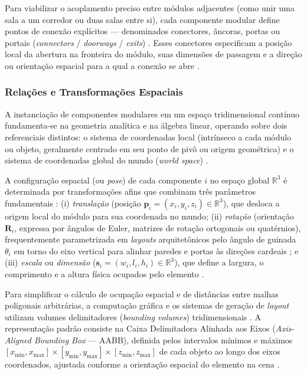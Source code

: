 Para viabilizar o acoplamento preciso entre módulos adjacentes (como unir uma sala a um corredor ou duas salas entre si), cada componente modular define pontos de conexão explícitos --- denominados conectores, âncoras, portas ou portais (\textit{connectors} / \textit{doorways} / \textit{exits}) \cite{inproceedings, linden2014dungeons, shaker2016constructive, sun2024roomplanner}. Esses conectores especificam a posição local da abertura na fronteira do módulo, suas dimensões de passagem e a direção ou orientação espacial para a qual a conexão se abre \cite{inproceedings, shaker2016constructive, sun2024roomplanner, xu2025databasedrivenframework3dlevel}.

\subsubsection{Relações e Transformações Espaciais}
\label{sec:transformacoes_espaciais}

A instanciação de componentes modulares em um espaço tridimensional contínuo fundamenta-se na geometria analítica e na álgebra linear, operando sobre dois referenciais distintos: o sistema de coordenadas local (intrínseco a cada módulo ou objeto, geralmente centrado em seu ponto de pivô ou origem geométrica) e o sistema de coordenadas global do mundo (\textit{world space}) \cite{sun2024roomplanner, xu2025constraint, ocal2024sceneteller}.

A configuração espacial (ou \textit{pose}) de cada componente $i$ no espaço global $\mathbb{R}^3$ é determinada por transformações afins que combinam três parâmetros fundamentais \cite{sun2024roomplanner, xu2025constraint}: (i) \textit{translação} (posição $\mathbf{p}_i = (x_i, y_i, z_i) \in \mathbb{R}^3$), que desloca a origem local do módulo para sua coordenada no mundo; (ii) \textit{rotação} (orientação $\mathbf{R}_i$, expressa por ângulos de Euler, matrizes de rotação ortogonais ou quatérnios), frequentemente parametrizada em \textit{layouts} arquitetônicos pelo ângulo de guinada $\theta_i$ em torno do eixo vertical para alinhar paredes e portas às direções cardeais \cite{sun2024roomplanner, xu2025databasedrivenframework3dlevel}; e (iii) \textit{escala} ou \textit{dimensão} ($\mathbf{s}_i = (w_i, l_i, h_i) \in \mathbb{R}^3$), que define a largura, o comprimento e a altura física ocupados pelo elemento \cite{sun2024roomplanner, xu2025constraint}.

Para simplificar o cálculo de ocupação espacial e de distâncias entre malhas poligonais arbitrárias, a computação gráfica e os sistemas de geração de \textit{layout} utilizam volumes delimitadores (\textit{bounding volumes}) tridimensionais \cite{sun2024roomplanner, xu2025constraint, xu2025databasedrivenframework3dlevel}. A representação padrão consiste na Caixa Delimitadora Alinhada aos Eixos (\textit{Axis-Aligned Bounding Box} --- AABB), definida pelos intervalos mínimos e máximos $[x_{\min}, x_{\max}] \times [y_{\min}, y_{\max}] \times [z_{\min}, z_{\max}]$ de cada objeto ao longo dos eixos coordenados, ajustada conforme a orientação espacial do elemento na cena \cite{sun2024roomplanner, xu2025constraint}.

